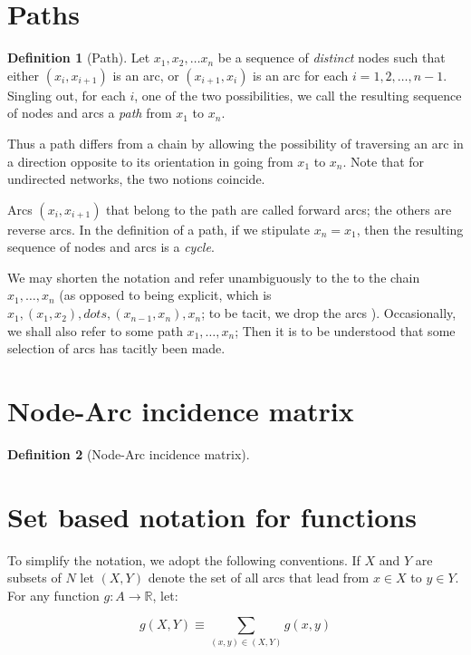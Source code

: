 \documentclass[titlepage]{article}
\newcommand{\R}{\mathbb{R}}
\theoremstyle{plain}
\theoremstyle{definition}
\newtheorem{definition}{Definition}[theorem]
\theoremstyle{remark}
\begin{document}
\section{Paths}
\begin{definition}[Path]
    Let $x_1, x_2, \dots x_n$ be a sequence of \emph{distinct} nodes such that
    either $(x_i, x_{i+1})$ is an arc, or $(x_{i+1}, x_i)$ is an arc for each
    $i = 1, 2, \dots, n-1$. Singling out, for each $i$, one of the two
    possibilities, we call the resulting sequence of nodes and arcs a \emph{path}
    from $x_1$ to $x_n$.
\end{definition}

Thus a path differs from a chain by allowing the possibility of traversing an
arc in a direction opposite to its orientation in going from $x_1$ to $x_n$. 
Note that for undirected networks, the two notions coincide.

Arcs $(x_i, x_{i+1})$ that belong to the path are called forward arcs; the
others are reverse arcs. In the definition of a path, if we stipulate $x_n = x_1$,
then the resulting sequence of nodes and arcs is a \emph{cycle}.

We may shorten the notation and refer unambiguously to the to the chain 
$x_1, \dots, x_n$ (as opposed to being explicit,
which is $x_1, (x_1, x_2), dots, (x_{n-1}, x_n), x_n$; to be tacit, we drop the arcs ).
Occasionally, we shall also refer to some path $x_1, \dots, x_n$;
Then it is to be understood that some selection of arcs has tacitly been made.

\section{Node-Arc incidence matrix}

\begin{definition}[Node-Arc incidence matrix]
\end{definition}

\section{Set based notation for functions}
To simplify the notation, we adopt the following conventions. If $X$ and $Y$
are subsets of $N$ let $(X, Y)$ denote the set of all arcs that lead from
$x \in X$ to $y \in Y$. For any function $g: A \rightarrow \R$, let:

\begin{equation}
    \tag{function on arc-set}
    g(X, Y) \equiv \sum_{(x, y) \in (X, Y)} g(x, y)
    \label{defn:function-on-arc-set}
\end{equation}
\end{document}
